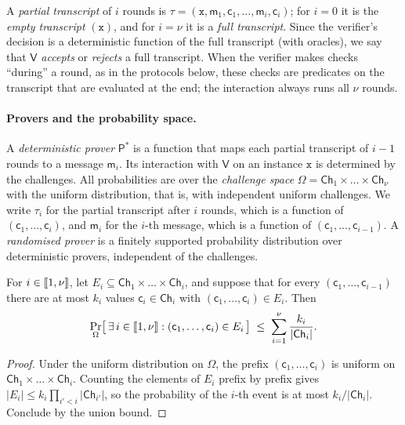 A \emph{partial transcript} of $i$ rounds is $\tau = (\mathtt{x}, \mathsf{m}_1, \mathsf{c}_1, \dots, \mathsf{m}_i, \mathsf{c}_i)$; for $i = 0$ it is the \emph{empty transcript} $(\mathtt{x})$, and for $i = \nu$ it is a \emph{full transcript}.
Since the verifier's decision is a deterministic function of the full transcript (with oracles), we say that $\mathsf{V}$ \emph{accepts} or \emph{rejects} a full transcript.
When the verifier makes checks ``during'' a round, as in the protocols below, these checks are predicates on the transcript that are evaluated at the end; the interaction always runs all $\nu$ rounds.

\paragraph{Provers and the probability space.}
A \emph{deterministic prover} $\mathsf{P}^*$ is a function that maps each partial transcript of $i-1$ rounds to a message $\mathsf{m}_i$.
Its interaction with $\mathsf{V}$ on an instance $\mathtt{x}$ is determined by the challenges.
All probabilities are over the \emph{challenge space} $\Omega = \mathsf{Ch}_1 \times \dots \times \mathsf{Ch}_\nu$ with the uniform distribution, that is, with independent uniform challenges.
We write $\tau_i$ for the partial transcript after $i$ rounds, which is a function of $(\mathsf{c}_1,\dots,\mathsf{c}_i)$, and $\mathsf{m}_i$ for the $i$-th message, which is a function of $(\mathsf{c}_1,\dots,\mathsf{c}_{i-1})$.
A \emph{randomised prover} is a finitely supported probability distribution over deterministic provers, independent of the challenges.

\begin{lemma}\label{lem:sequential}
For $i \in \llbracket 1, \nu \rrbracket$, let $E_i \subseteq \mathsf{Ch}_1 \times \dots \times \mathsf{Ch}_i$, and suppose that for every $(\mathsf{c}_1,\dots,\mathsf{c}_{i-1})$ there are at most $k_i$ values $\mathsf{c}_i \in \mathsf{Ch}_i$ with $(\mathsf{c}_1,\dots,\mathsf{c}_i) \in E_i$. Then
\[
  \Pr_{\Omega}\bigl[\, \exists\, i \in \llbracket 1, \nu \rrbracket : (\mathsf{c}_1,\dots,\mathsf{c}_i) \in E_i \,\bigr] \;\le\; \sum_{i=1}^{\nu} \frac{k_i}{|\mathsf{Ch}_i|}.
\]
\end{lemma}

\begin{proof}
Under the uniform distribution on $\Omega$, the prefix $(\mathsf{c}_1,\dots,\mathsf{c}_{i})$ is uniform on $\mathsf{Ch}_1 \times \dots \times \mathsf{Ch}_i$.
Counting the elements of $E_i$ prefix by prefix gives $|E_i| \le k_i \prod_{i' < i} |\mathsf{Ch}_{i'}|$, so the probability of the $i$-th event is at most $k_i/|\mathsf{Ch}_i|$. Conclude by the union bound.
\end{proof}

